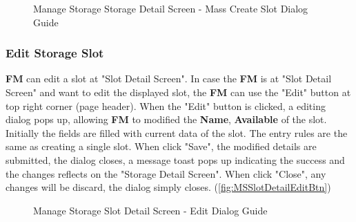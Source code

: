 \begin{figure}[H]
    \vspace{10pt}
    \caption{Manage Storage Storage Detail Screen - Mass Create Slot Dialog Guide}
	\label{fig:MSobjmassCreateSlotGuide}
\end{figure}


\subsubsection{Edit Storage Slot}
\textbf{FM} can edit a slot at "Slot Detail Screen".
In case the \textbf{FM} is at "Slot Detail Screen" and want to edit the displayed slot, the \textbf{FM} can use the "Edit" button at top right corner (page header). 
When the "Edit" button is clicked, a editing dialog pops up, allowing \textbf{FM} to modified the \textbf{Name}, \textbf{Available} of the slot. Initially the fields are filled with current data of the slot. The entry rules are the same as creating a single slot.
When click "Save", the modified details are submitted, the dialog closes, a message toast pops up indicating the success and the changes reflects on the "Storage Detail Screen". When click "Close", any changes will be discard, the dialog simply closes.
(\autoref{fig:MSSlotDetailEditBtn})

\begin{figure}[H]
	\centering
    \vspace{5pt}
    \hspace{5pt}
    \caption{Manage Storage Slot Detail Screen - Edit Dialog Guide}
	\label{fig:MSSlotDetailEditBtn}
\end{figure}

